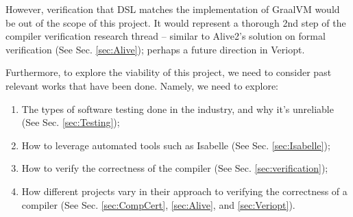However, verification that DSL matches the implementation of GraalVM would be out of the scope of this project. It would represent a thorough 
2nd step of the compiler verification research thread \cite[p. 5]{CompilerOptimization} -- similar to Alive2's \cite{Alive2} solution on formal 
verification (See Sec. \ref{sec:Alive}); perhaps a future direction in Veriopt.

Furthermore, to explore the viability of this project, we need to consider past relevant works that have been done. Namely, we need to explore:

\begin{enumerate}
    \item The types of software testing done in the industry, and why it's unreliable (See Sec. \ref{sec:Testing});
    \item How to leverage automated tools such as Isabelle (See Sec. \ref{sec:Isabelle});
    \item How to verify the correctness of the compiler (See Sec. \ref{sec:verification});
    \item How different projects vary in their approach to verifying the correctness of a compiler (See Sec. \ref{sec:CompCert}, 
          \ref{sec:Alive}, and \ref{sec:Veriopt}).
\end{enumerate}